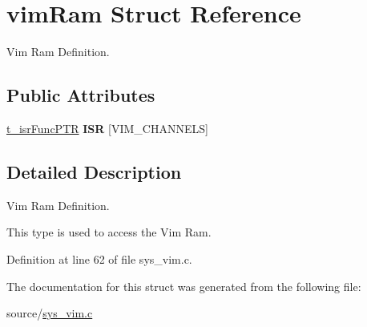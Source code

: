 \hypertarget{structvimRam}{}\section{vim\+Ram Struct Reference}
\label{structvimRam}


Vim Ram Definition.  


\subsection*{Public Attributes}
\begin{DoxyCompactItemize}
\item 
\mbox{\label{structvimRam_ad1744d2299bb64ea7eda004520648c40}} 
\mbox{\hyperlink{sys__vim_8h_a081e608fbf0927e18d08a4d8a96bf06a}{t\+\_\+isr\+Func\+P\+TR}} {\bfseries I\+SR} \mbox{[}V\+I\+M\+\_\+\+C\+H\+A\+N\+N\+E\+LS\mbox{]}
\end{DoxyCompactItemize}


\subsection{Detailed Description}
Vim Ram Definition. 

This type is used to access the Vim Ram. 

Definition at line 62 of file sys\+\_\+vim.\+c.



The documentation for this struct was generated from the following file\+:\begin{DoxyCompactItemize}
\item 
source/\mbox{\hyperlink{sys__vim_8c}{sys\+\_\+vim.\+c}}\end{DoxyCompactItemize}
